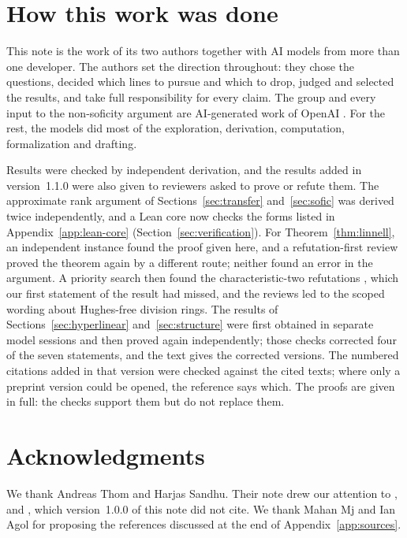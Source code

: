 \documentclass[11pt]{article}
\theoremstyle{definition}
\theoremstyle{remark}
\numberwithin{equation}{section}
\begin{document}
\section*{How this work was done}

This note is the work of its two authors together with AI models from more than one developer. The authors set the direction throughout: they chose the questions, decided which lines to pursue and which to drop, judged and selected the results, and take full responsibility for every claim. The group and every input to the non-soficity argument are AI-generated work of OpenAI \cite{OAI252}. For the rest, the models did most of the exploration, derivation, computation, formalization and drafting.

Results were checked by independent derivation, and the results added in version~1.1.0 were also given to reviewers asked to prove or refute them. The approximate rank argument of Sections~\ref{sec:transfer} and~\ref{sec:sofic} was derived twice independently, and a Lean core now checks the forms listed in Appendix~\ref{app:lean-core} (Section~\ref{sec:verification}). For Theorem~\ref{thm:linnell}, an independent instance found the proof given here, and a refutation-first review proved the theorem again by a different route; neither found an error in the argument. A priority search then found the characteristic-two refutations \cite{OAI196,OAI197}, which our first statement of the result had missed, and the reviews led to the scoped wording about Hughes-free division rings. The results of Sections~\ref{sec:hyperlinear} and~\ref{sec:structure} were first obtained in separate model sessions and then proved again independently; those checks corrected four of the seven statements, and the text gives the corrected versions. The numbered citations added in that version were checked against the cited texts; where only a preprint version could be opened, the reference says which. The proofs are given in full: the checks support them but do not replace them.

\section*{Acknowledgments}

We thank Andreas Thom and Harjas Sandhu. Their note \cite{SandhuThom26} drew our attention to \cite{ChapmanPeled25}, \cite{Sauer2016} and \cite{Soule1999}, which version~1.0.0 of this note did not cite. We thank Mahan Mj and Ian Agol for proposing the references discussed at the end of Appendix~\ref{app:sources}.
\end{document}
